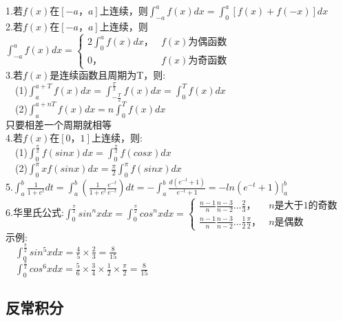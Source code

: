 \documentclass{article}
\begin{document}
\begin{flushleft}
	1.若$f(x)$在$[-a，a]$上连续，则$\int_{-a}^{a}f(x)dx=\int_{0}^{a}[f(x)+f(-x)]dx$\\
	2.若$f(x)$在$[-a，a]$上连续，则$\int_{-a}^{a}f(x)dx=\left\{
	\begin{array}{lcl}
	2\int_{0}^{a}f(x)dx， & f(x)\mbox{为偶函数}\\
	0， & f(x)\mbox{为奇函数}
	\end{array} \right.$\\
	3.若$f(x)$是连续函数且周期为T，则:\\
	\ \ (1)$\int_{a}^{a+T}f(x)dx=\int_{-\frac{T}{2}}^{\frac{T}{2}}f(x)dx=\int_{0}^{T}f(x)dx$\\
	\ \ (2)$\int_{a}^{a+nT}f(x)dx=n\int_{0}^{T}f(x)dx$\\
	只要相差一个周期就相等\\
	4.若$f(x)$在$[0，1]$上连续，则:\\
	\ \ (1)$\int_{0}^{\frac{\pi}{2}}f(sinx)dx=\int_{0}^{\frac{\pi}{2}}f(cosx)dx$\\
	\ \ (2)$\int_{0}^{\pi}xf(sinx)dx=\frac{\pi}{2}\int_{0}^{\pi}f(sinx)dx$\\
	5.$\int_{a}^{b}\frac{1}{1+e^t}dt=\int_{a}^{b}(\frac{1}{1+e^t}\frac{e^{-t}}{e^{-t}})dt=-\int_{a}^{b}\frac{d(e^{-t}+1)}{e^{-t}+1}=-ln(e^{-t}+1)|_a^b$\\
	6.华里氏公式:$\int_{0}^{\frac{\pi}{2}}sin^nxdx=\int_{0}^{\frac{\pi}{2}}cos^nxdx=\left\{
	\begin{array}{lcl}
	\frac{n-1}{n}\frac{n-3}{n-2}...\frac{2}{3}， & n\mbox{是大于1的奇数}\\
	\frac{n-1}{n}\frac{n-3}{n-2}...\frac{1}{2}\frac{\pi}{2}， & n\mbox{是偶数}
	\end{array} \right.$\\
	示例:\\
	\ \ $\int_{0}^{\frac{\pi}{2}}sin^5xdx=\frac{4}{5}\times\frac{2}{3}=\frac{8}{15}$\\
	\ \ $\int_{0}^{\frac{\pi}{2}}cos^6xdx=\frac{5}{6}\times\frac{3}{4}\times\frac{1}{2}\times\frac{\pi}{2}=\frac{8}{15}$\\
	
	\subsection{反常积分}
	

\end{flushleft}
\end{document}
